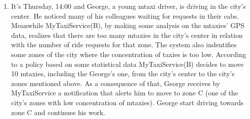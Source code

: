 \documentclass[11pt]{article} %
\begin{document}
\begin{enumerate}
	    \item It's Thursday, 14:00 and George, a young mtaxi driver, is driving in the city's center.
	       He noticed many of his colleagues waiting for requests in their cabs.
	       Meanwhile MyTaxiService(B), by making some analysis on the mtaxies' GPS data, realizes that there are too many mtaxies
	       in the city's center in relation with the number of ride requests for that zone. The system also indentifies
	       some zones of the city where the concentration of taxies is too low. According to a policy based on some statistical data
	       MyTaxiService(B) decides to move 10 mtaxies, including the George's one, from the city's center to the city's zones mentioned above.
	       As a consequence of that, George receives by MyTaxiService a notification that alerts him to move to zone C (one of the city's zones
	       with low concentration of mtaxies). George start driving towards zone C and continues his work.
	\end{enumerate}

		     \newpage
\end{document}
